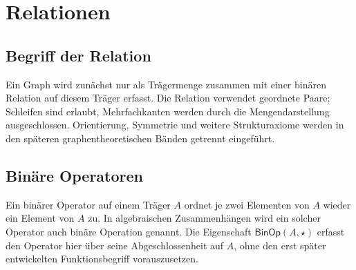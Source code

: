 \documentclass[main.tex]{subfiles}
\begin{document}
\chapter{Relationen}

\section{Begriff der Relation}


Ein Graph wird zunächst nur als Trägermenge zusammen mit einer binären
Relation auf diesem Träger erfasst.  Die Relation verwendet geordnete Paare;
Schleifen sind erlaubt, Mehrfachkanten werden durch die Mengendarstellung
ausgeschlossen.  Orientierung, Symmetrie und weitere Strukturaxiome werden
in den späteren graphentheoretischen Bänden getrennt eingeführt.


\section{Binäre Operatoren}

Ein binärer Operator auf einem Träger \(A\) ordnet je zwei Elementen von
\(A\) wieder ein Element von \(A\) zu. In algebraischen Zusammenhängen wird
ein solcher Operator auch binäre Operation genannt. Die Eigenschaft
\(\mathsf{BinOp}\!\left(A,\star\right)\) erfasst den Operator hier über seine
Abgeschlossenheit auf \(A\), ohne den erst später entwickelten Funktionsbegriff
vorauszusetzen.


\end{document}
